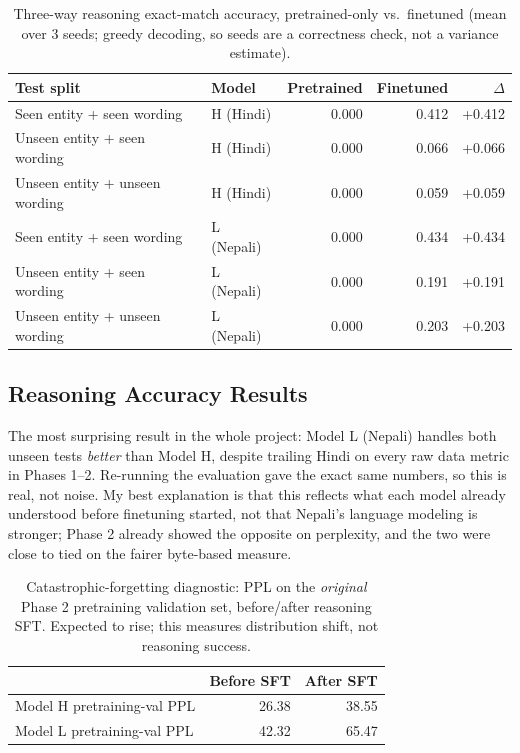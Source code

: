 \documentclass[11pt]{article}
\begin{document}
\begin{table}[h]
\centering\small
\begin{tabular}{llrrr}
\toprule
\textbf{Test split} & \textbf{Model} & \textbf{Pretrained} & \textbf{Finetuned} & \textbf{$\Delta$} \\
\midrule
Seen entity + seen wording & H (Hindi) & 0.000 & 0.412 & +0.412 \\
Unseen entity + seen wording & H (Hindi) & 0.000 & 0.066 & +0.066 \\
Unseen entity + unseen wording & H (Hindi) & 0.000 & 0.059 & +0.059 \\
Seen entity + seen wording & L (Nepali) & 0.000 & 0.434 & +0.434 \\
Unseen entity + seen wording & L (Nepali) & 0.000 & 0.191 & +0.191 \\
Unseen entity + unseen wording & L (Nepali) & 0.000 & 0.203 & +0.203 \\
\bottomrule
\end{tabular}
\caption{Three-way reasoning exact-match accuracy, pretrained-only vs.\ finetuned (mean over 3 seeds; greedy decoding, so seeds are a correctness check, not a variance estimate).}
\label{tab:reasoning-acc}
\end{table}

\subsection{Reasoning Accuracy Results}

The most surprising result in the whole project: Model L (Nepali) handles both unseen tests \emph{better} than Model H, despite trailing Hindi on every raw data metric in Phases 1--2. Re-running the evaluation gave the exact same numbers, so this is real, not noise. My best explanation is that this reflects what each model already understood before finetuning started, not that Nepali's language modeling is stronger; Phase 2 already showed the opposite on perplexity, and the two were close to tied on the fairer byte-based measure.

\begin{table}[h]
\centering\small
\begin{tabular}{lrr}
\toprule
& \textbf{Before SFT} & \textbf{After SFT} \\
\midrule
Model H pretraining-val PPL & 26.38 & 38.55 \\
Model L pretraining-val PPL & 42.32 & 65.47 \\
\bottomrule
\end{tabular}
\caption{Catastrophic-forgetting diagnostic: PPL on the \emph{original} Phase 2 pretraining validation set, before/after reasoning SFT. Expected to rise; this measures distribution shift, not reasoning success.}
\end{table}
\end{document}
